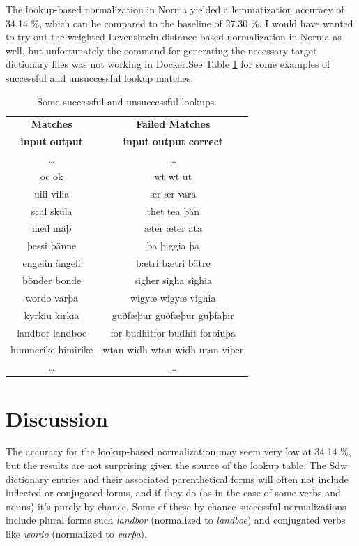 \documentclass[11pt,a4paper]{article}
\begin{document}
The lookup-based normalization in Norma yielded a lemmatization accuracy of 34.14 \%, which can be compared to the baseline of 27.30 \%. I would have wanted to try out the weighted Levenshtein distance-based normalization in Norma as well, but unfortunately the command for generating the necessary target dictionary files was not working in Docker.See Table \ref{tab:matches}  for some examples of successful and unsuccessful lookup matches.

    \begin{table}[tb]
    \centering
    \begin{tabular}{c|c}
        \textbf{Matches} & \textbf{Failed Matches} \\
        \textbf{input} \quad \textbf{output} & \textbf{input} \quad \textbf{output} \quad \textbf{correct} \\
         \ldots & \ldots \\
        oc  \quad ok & wt \quad wt \quad ut \\
        uili \quad vilia & ær \quad ær \quad vara \\
        scal \quad skula & thet \quad tea \quad þän \\
        med \quad mäþ & æter \quad æter \quad äta \\
        þessi \quad þänne & þa \quad þiggia \quad þa \\
        engelin \quad ängeli & bætri \quad bætri \quad bätre \\
        bönder \quad bonde & sigher \quad sigha \quad sighia \\
        wordo \quad varþa & wigyæ \quad wigyæ \quad vighia\\
        kyrkiu  \quad kirkia & guðfæþur \quad guðfæþur \quad guþfaþir\\
        landbor \quad landboe &	for budhit\quad for budhit \quad forbiuþa \\
        himmerike \quad himirike & wtan widh \quad wtan widh \quad utan viþer \\
        \ldots & \ldots
    \end{tabular}
    \caption{\label{tab:matches}Some successful and unsuccessful lookups.}
    \end{table}

\section{Discussion}


The accuracy for the lookup-based normalization may seem very low at 34.14 \%, but the results are not surprising given the source of the lookup table. The Sdw dictionary entries and their associated parenthetical forms will often not include inflected or conjugated forms, and if they do (as in the case of some verbs and nouns) it's purely by chance. Some of these by-chance successful normalizations include plural forms such \emph{landbor} (normalized to \emph{landboe}) and conjugated verbs like \emph{wordo} (normalized to \emph{varþa}). 
\end{document}
